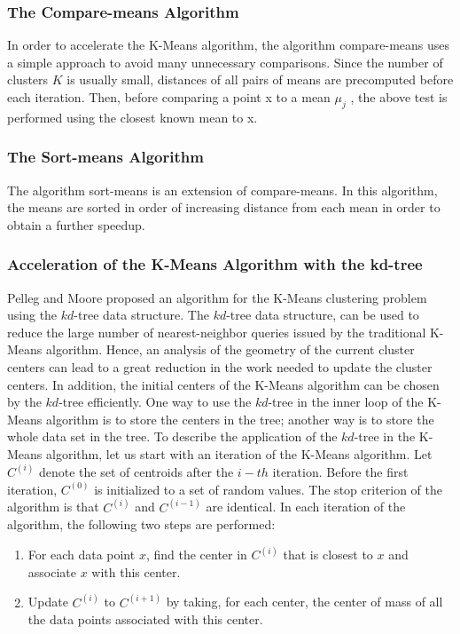 \documentclass[12pt,a4paper]{article}
\begin{document}
\subsubsection{The Compare-means Algorithm}
In order to accelerate the K-Means algorithm, the algorithm compare-means uses a simple approach to avoid many unnecessary comparisons. Since the number of clusters $K$ is usually small, distances of all pairs of means are precomputed before each iteration. Then, before comparing a point x to a mean $\mu_j$ , the above test is performed using the closest known mean to x.

\subsubsection{The Sort-means Algorithm}
The algorithm sort-means is an extension of compare-means. In this algorithm, the means are sorted in order of increasing distance from each mean in order to obtain a further speedup.

\subsubsection{Acceleration of the K-Means Algorithm with the kd-tree}
Pelleg and Moore proposed an algorithm for the K-Means clustering problem using the $kd$-tree data structure. The $kd$-tree data structure, can be used to reduce the large number of nearest-neighbor queries issued by the traditional K-Means algorithm. Hence, an analysis of the geometry of the current cluster centers can lead to a great reduction in the work needed to update the cluster centers. In addition, the initial centers of the K-Means algorithm can be chosen by the $kd$-tree efficiently. One way to use the $kd$-tree in the inner loop of the K-Means algorithm is to store the centers in the tree; another way is to store the whole data set in the tree. To describe the application of the $kd$-tree in the K-Means algorithm, let us start with an iteration of the K-Means algorithm. Let $C^{\left(i\right)}$ denote the set of centroids after the $i-th$ iteration. Before the first iteration,
$C^{\left(0\right)}$ is initialized to a set of random values. The stop criterion of the algorithm is that $C^{\left(i\right)}$ and $C^{\left(i-1\right)}$ are identical. In each iteration of the algorithm, the following two steps are performed:
\begin{enumerate}
\item For each data point $x$, find the center in $C^{\left(i\right)}$ that is closest to $x$ and associate $x$ with this center.
\item Update $C^{\left(i\right)}$ to $C^{\left(i+1\right)}$ by taking, for each center, the center of mass of all the data points associated with this center.
\end{enumerate}
\end{document}
